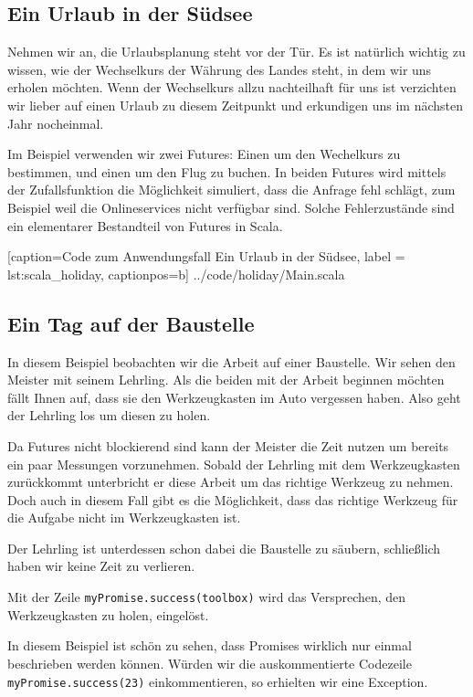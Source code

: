 \documentclass[11pt,a4paper,titlepage,ngerman]{scrartcl}
\begin{document}
\subsection{Ein Urlaub in der Südsee}

Nehmen wir an, die Urlaubsplanung steht vor der Tür. Es ist natürlich wichtig
zu wissen, wie der Wechselkurs der Währung des Landes steht, in dem wir uns
erholen möchten. Wenn der Wechselkurs allzu nachteilhaft für uns ist
verzichten wir lieber auf einen Urlaub zu diesem Zeitpunkt und erkundigen
uns im nächsten Jahr nocheinmal.

Im Beispiel verwenden wir zwei Futures: Einen um den Wechelkurs zu bestimmen,
und einen um den Flug zu buchen. In beiden Futures wird mittels der Zufallsfunktion
die Möglichkeit simuliert, dass die Anfrage fehl schlägt, zum Beispiel weil
die Onlineservices nicht verfügbar sind. Solche Fehlerzustände sind ein elementarer
Bestandteil von Futures in Scala.


    [caption={Code zum Anwendungsfall \glqq Ein Urlaub in der Südsee\grqq },
       label = lst:scala_holiday,
       captionpos=b]
 {../code/holiday/Main.scala}
 

\subsection{Ein Tag auf der Baustelle}

In diesem Beispiel beobachten wir die Arbeit auf einer Baustelle. Wir sehen
den Meister mit seinem Lehrling. Als die beiden mit der Arbeit beginnen möchten
fällt Ihnen auf, dass sie den Werkzeugkasten im Auto vergessen haben. Also
geht der Lehrling los um diesen zu holen.

Da Futures nicht blockierend sind kann der Meister die Zeit nutzen um bereits
ein paar Messungen vorzunehmen. Sobald der Lehrling mit dem Werkzeugkasten
zurückkommt unterbricht er diese Arbeit um das richtige Werkzeug zu nehmen.
Doch auch in diesem Fall gibt es die Möglichkeit, dass das richtige Werkzeug
für die Aufgabe nicht im Werkzeugkasten ist.

Der Lehrling ist unterdessen schon dabei die Baustelle zu säubern, schließlich
haben wir keine Zeit zu verlieren.

Mit der Zeile \texttt{myPromise.success(toolbox)} wird das Versprechen,
den Werkzeugkasten zu holen, eingelöst.

In diesem Beispiel ist schön zu sehen, dass Promises wirklich nur einmal
beschrieben werden können. Würden wir die auskommentierte Codezeile
\texttt{myPromise.success(23)} einkommentieren, so erhielten wir eine
Exception.
\end{document}
